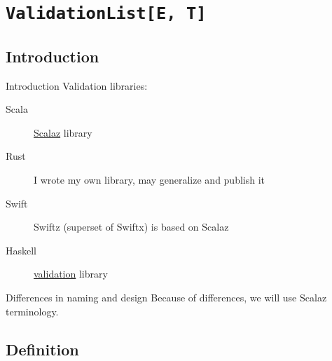 \section{\texttt{ValidationList[E, T]}}

\subsection{Introduction}

\begin{frame}{Introduction}
  Validation libraries:
  \begin{description}
  \item[Scala] \href{https://github.com/scalaz/scalaz}{Scalaz} library
  \item[Rust] I wrote my own library, may generalize and publish it
  \item[Swift] Swiftz (superset of Swiftx) is based on Scalaz
  \item[Haskell]
    \href{https://hackage.haskell.org/package/validation}{validation} library
  \end{description}

  \begin{alertblock}{Differences in naming and design}
    Because of differences, we will use Scalaz terminology.
  \end{alertblock}
\end{frame}

\subsection{Definition}


